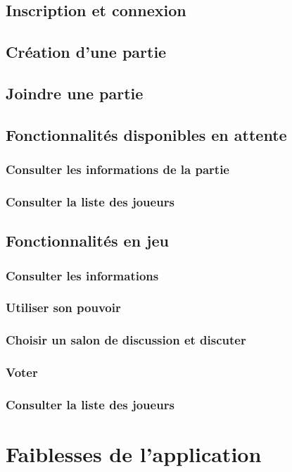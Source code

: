 \documentclass[10pt]{article}
\begin{document}
\subsection{Inscription et connexion}
\subsection{Création d'une partie}
\subsection{Joindre une partie}
\subsection{Fonctionnalités disponibles en attente}
\subsubsection{Consulter les informations de la partie}
\subsubsection{Consulter la liste des joueurs}
\subsection{Fonctionnalités en jeu}
\subsubsection{Consulter les informations}
\subsubsection{Utiliser son pouvoir}
\subsubsection{Choisir un salon de discussion et discuter}
\subsubsection{Voter}
\subsubsection{Consulter la liste des joueurs}

\section{Faiblesses de l'application}
\end{document}
